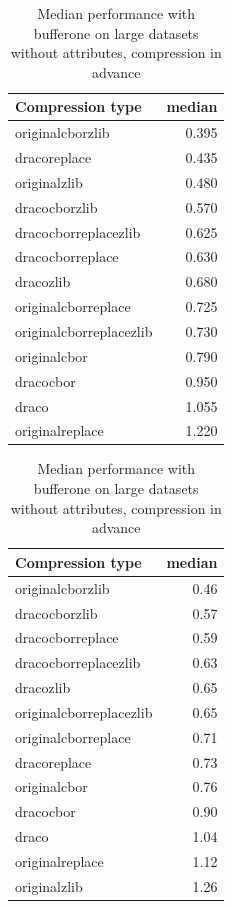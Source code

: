   \begin{table}[!h]
    \begin{minipage}{.5\linewidth}
      \caption{
Median performance with bufferone on large datasets, compression in advance}
\centering

\begin{tabular}{|l|r|}
\hline
Compression type & median\\
\hline
originalcborzlib & 0.395\\
\hline
dracoreplace & 0.435\\
\hline
originalzlib & 0.480\\
\hline
dracocborzlib & 0.570\\
\hline
dracocborreplacezlib & 0.625\\
\hline
dracocborreplace & 0.630\\
\hline
dracozlib & 0.680\\
\hline
originalcborreplace & 0.725\\
\hline
originalcborreplacezlib & 0.730\\
\hline
originalcbor & 0.790\\
\hline
dracocbor & 0.950\\
\hline
draco & 1.055\\
\hline
originalreplace & 1.220\\
\hline
\end{tabular}
\end{minipage}%
    \begin{minipage}{.5\linewidth}
      \centering
        \caption{
Median performance with bufferone on large datasets without attributes, compression in advance}

\begin{tabular}{|l|r|}
\hline
Compression type & median\\
\hline
originalcborzlib & 0.46\\
\hline
dracocborzlib & 0.57\\
\hline
dracocborreplace & 0.59\\
\hline
dracocborreplacezlib & 0.63\\
\hline
dracozlib & 0.65\\
\hline
originalcborreplacezlib & 0.65\\
\hline
originalcborreplace & 0.71\\
\hline
dracoreplace & 0.73\\
\hline
originalcbor & 0.76\\
\hline
dracocbor & 0.90\\
\hline
draco & 1.04\\
\hline
originalreplace & 1.12\\
\hline
originalzlib & 1.26\\
\hline
\end{tabular}
\end{minipage} 
\end{table}
